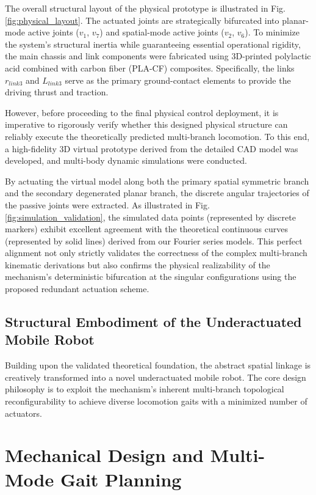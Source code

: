\documentclass[a4paper,fleqn]{cas-sc}
\begin{document}
The overall structural layout of the physical prototype is illustrated in Fig. \ref{fig:physical_layout}. The actuated joints are strategically bifurcated into planar-mode active joints ($v_1$, $v_7$) and spatial-mode active joints ($v_2$, $v_6$). To minimize the system's structural inertia while guaranteeing essential operational rigidity, the main chassis and link components were fabricated using 3D-printed polylactic acid combined with carbon fiber (PLA-CF) composites. Specifically, the links $r_{link3}$ and $L_{link3}$ serve as the primary ground-contact elements to provide the driving thrust and traction.

However, before proceeding to the final physical control deployment, it is imperative to rigorously verify whether this designed physical structure can reliably execute the theoretically predicted multi-branch locomotion. To this end, a high-fidelity 3D virtual prototype derived from the detailed CAD model was developed, and multi-body dynamic simulations were conducted. 

By actuating the virtual model along both the primary spatial symmetric branch and the secondary degenerated planar branch, the discrete angular trajectories of the passive joints were extracted. As illustrated in Fig. \ref{fig:simulation_validation}, the simulated data points (represented by discrete markers) exhibit excellent agreement with the theoretical continuous curves (represented by solid lines) derived from our Fourier series models. This perfect alignment not only strictly validates the correctness of the complex multi-branch kinematic derivations but also confirms the physical realizability of the mechanism's deterministic bifurcation at the singular configurations using the proposed redundant actuation scheme.
\subsection{Structural Embodiment of the Underactuated Mobile Robot}
Building upon the validated theoretical foundation, the abstract spatial linkage is creatively transformed into a novel underactuated mobile robot. The core design philosophy is to exploit the mechanism's inherent multi-branch topological reconfigurability to achieve diverse locomotion gaits with a minimized number of actuators. 


\section{Mechanical Design and Multi-Mode Gait Planning}
\end{document}
